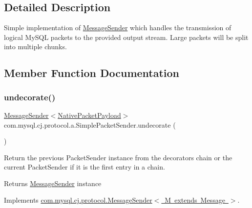 \subsection{Detailed Description}
Simple implementation of \mbox{\hyperlink{interfacecom_1_1mysql_1_1cj_1_1protocol_1_1_message_sender}{Message\+Sender}} which handles the transmission of logical My\+S\+QL packets to the provided output stream. Large packets will be split into multiple chunks. 

\subsection{Member Function Documentation}
\mbox{\label{classcom_1_1mysql_1_1cj_1_1protocol_1_1a_1_1_simple_packet_sender_a7258a5245f263cf4635daba8be258e36}} 
\subsubsection{\texorpdfstring{undecorate()}{undecorate()}}
{\footnotesize\ttfamily \mbox{\hyperlink{interfacecom_1_1mysql_1_1cj_1_1protocol_1_1_message_sender}{Message\+Sender}}$<$\mbox{\hyperlink{classcom_1_1mysql_1_1cj_1_1protocol_1_1a_1_1_native_packet_payload}{Native\+Packet\+Payload}}$>$ com.\+mysql.\+cj.\+protocol.\+a.\+Simple\+Packet\+Sender.\+undecorate (\begin{DoxyParamCaption}{ }\end{DoxyParamCaption})}

Return the previous Packet\+Sender instance from the decorators chain or the current Packet\+Sender if it is the first entry in a chain.

\begin{DoxyReturn}{Returns}
\mbox{\hyperlink{interfacecom_1_1mysql_1_1cj_1_1protocol_1_1_message_sender}{Message\+Sender}} instance 
\end{DoxyReturn}


Implements \mbox{\hyperlink{interfacecom_1_1mysql_1_1cj_1_1protocol_1_1_message_sender_a3a352bf35ad98dc6cea7c1f4ac9480da}{com.\+mysql.\+cj.\+protocol.\+Message\+Sender$<$ M extends Message $>$}}.

